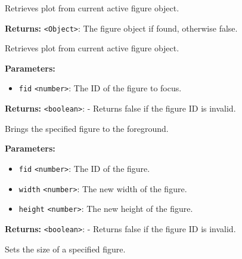 \documentclass[12pt,a4paper]{article}
\begin{document}
\noindent Retrieves plot from current active figure object.

\vspace{5mm}
\noindent {}


\noindent \textbf{Returns:} \texttt{<Object>}: The figure object if found, otherwise \textasciigrave{}false\textasciigrave{}.

\noindent Retrieves plot from current active figure object.

\vspace{5mm}
\noindent {}


\noindent \textbf{Parameters:}
\begin{itemize}
  \item \texttt{fid} \texttt{<number>}: The ID of the figure to focus.
\end{itemize}

\noindent \textbf{Returns:} \texttt{<boolean>}: - Returns false if the figure ID is invalid.

\noindent Brings the specified figure to the foreground.

\vspace{5mm}
\noindent {}


\noindent \textbf{Parameters:}
\begin{itemize}
  \item \texttt{fid} \texttt{<number>}: The ID of the figure.
  \item \texttt{width} \texttt{<number>}: The new width of the figure.
  \item \texttt{height} \texttt{<number>}: The new height of the figure.
\end{itemize}

\noindent \textbf{Returns:} \texttt{<boolean>}: - Returns false if the figure ID is invalid.

\noindent Sets the size of a specified figure.

\vspace{5mm}
\noindent {}
\end{document}
